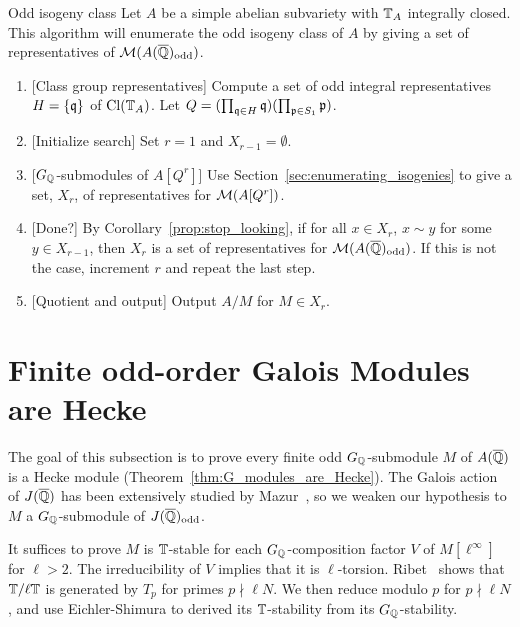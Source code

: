 \documentclass[11pt, proquest]{uwthesis}
\begin{document}
\begin{algorithm}{Odd isogeny class}%
    \label{alg:odd_isogeny_class}
    Let $A$ be a simple abelian subvariety with $\mathbb{T}_A$ integrally closed. This
    algorithm will enumerate the odd isogeny class of $A$ by giving a set of
    representatives of $\mathcal{M}(A(\overline{\mathbb{Q}})_{\mathrm{odd}})$.
    \begin{enumerate}
        \item{} [Class group representatives]
            Compute a set of odd integral representatives $H=\{\mathfrak{q}\}$ of
            $\operatorname{Cl}(\mathbb{T}_A)$. Let $Q = (\prod_{\mathfrak{q}\in H} \mathfrak{q})(\prod_{\mathfrak{p}\in S_1} \mathfrak{p})$. 
        \item{} [Initialize search]
            Set $r=1$ and $X_{r-1}=\emptyset$.
        \item{} [$G_{\mathbb{Q}}$-submodules of $A[Q^r]$]
            Use Section~\ref{sec:enumerating_isogenies} to give a set, $X_r$,
            of representatives for $\mathcal{M}(A[Q^r])$.
        \item{} [Done?]
            By Corollary~\ref{prop:stop_looking}, if for all $x\in X_r$, $x\sim
            y$ for some $y\in X_{r-1}$, then $X_r$ is a set of representatives
            for $\mathcal{M}(A(\overline{\mathbb{Q}})_{\mathrm{odd}})$. If this is not the case, increment $r$
            and repeat the last step.
        \item{} [Quotient and output]
            Output $A/M$ for $M\in X_r$.
    \end{enumerate}
\end{algorithm}

\section{Finite odd-order Galois Modules are Hecke}%
\label{sec:finite_odd_order_galois_modules_are_hecke}

The goal of this subsection is to prove every finite odd $G_{\mathbb{Q}}$-submodule $M$
of $A(\overline{\mathbb{Q}})$ is a Hecke module (Theorem~\ref{thm:G_modules_are_Hecke}). The
Galois action of $J(\overline{\mathbb{Q}})$ has been extensively studied by
Mazur~\cite{mazur:eisenstein}, so we weaken our hypothesis to $M$ a
$G_{\mathbb{Q}}$-submodule of $J(\overline{\mathbb{Q}})_{\mathrm{odd}}$. 

It suffices to prove $M$ is $\mathbb{T}$-stable for each $G_{\mathbb{Q}}$-composition factor $V$
of $M[\ell^\infty]$ for $\ell>2$. The irreducibility of $V$ implies that it is
$\ell$-torsion. Ribet~\cite[Proposition 6.1]{ribet:semistable_gal} shows that
$\mathbb{T}/\ell \mathbb{T}$ is generated by $T_p$ for primes $p\nmid \ell N$. We then reduce
modulo $p$ for $p\nmid \ell N$, and use Eichler-Shimura to derived its
$\mathbb{T}$-stability from its $G_{\mathbb{Q}}$-stability.
\end{document}
